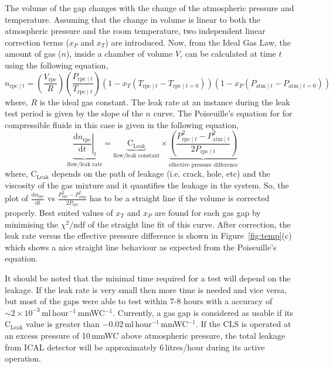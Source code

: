 \documentclass[a4paper,12pt,twoside,openany]{article}
\begin{document}
The volume of the gap changes with the change of the atmospheric pressure and temperature. Assuming that the change in volume is linear to both the atmospheric pressure and the room temperature, two independent linear correction terms ($x_P$ and $x_T$) are introduced. Now, from the Ideal Gas Law, the amount of gas ($n$), inside a chamber of volume $V$, can be calculated at time $t$ using the following equation,
\begin{equation}
  n_{\textrm{rpc}\mid t}=\left(\frac{V_{\textrm{rpc}}}{R}\right)\left(\frac{P_{\textrm{rpc}\mid t}}{T_{\textrm{rpc}\mid t}}\right)\left(1-x_T\left(T_{\textrm{rpc}\mid t}-T_{\textrm{rpc}\mid t=0}\right)\right)\left(1-x_P\left(P_{\textrm{atm}\mid t}-P_{\textrm{atm}\mid t=0}\right)\right) \label{eq:ct}
\end{equation}
where, $R$ is the ideal gas constant. The leak rate at an instance during the leak test period is given by the slope of the $n$ curve. The Poiseuille's equation\cite{poiseuille} for for compressible fluids in this case is given in the following equation,
\begin{equation}
  \underbrace{\left.\frac{\mathrm{d}n_{\textrm{rpc}}}{\mathrm{d}t}\right| _t}_\text{flow/leak rate}=\underbrace{\textrm{C}_{\textrm{Leak}}}_\text{flow/leak constant}\times\underbrace{\left(\frac {P_{{\textrm{rpc}\mid t} }^{2}-P_{{\textrm{atm}\mid t} }^{2}}{2P_{{\textrm{rpc}\mid t} }}\right)}_\text{effective pressure difference}\label{eq:poiseuille}
\end{equation}
where, $\textrm{C}_{\textrm{Leak}}$ depends on the path of leakage (i.e. crack, hole, etc) and the viscosity of the gas mixture and it quantifies the leakage in the system. So, the plot of $\frac{\mathrm{d}n_{\textrm{rpc}}}{\mathrm{d}t}$ vs $\frac{P_{\textrm{rpc}}^{2}-P_{\textrm{atm}}^{2}}{2P_{\textrm{rpc}}}$ has to be a straight line if the volume is corrected properly. Best suited values of $x_T$ and $x_P$ are found for each gas gap by minimising the $\chi^2/\textrm{ndf}$ of the straight line fit of this curve. After correction, the leak rate versus the effective pressure difference is shown in Figure~\ref{fig:temp}(c) which shows a nice straight line behaviour as expected from the Poiseuille's equation. 

It should be noted that the minimal time required for a test will depend on the leakage. If the leak rate is very small then more time is needed and vice versa, but most of the gaps were able to test within 7-8 hours with a accuracy of $\sim 2\times 10^{-3}$\,ml\,hour$^{-1}$\,mmWC$^{-1}$.  Currently, a gas gap is considered as usable if its $\textrm{C}_{\textrm{Leak}}$ value is greater than $-0.02$\,ml\,hour$^{-1}$\,mmWC$^{-1}$. If the CLS is operated at an excess pressure of 10\,mmWC above atmospheric pressure, the total leakage from ICAL detector will be approximately 6\,litres/hour during its active operation.
\end{document}
